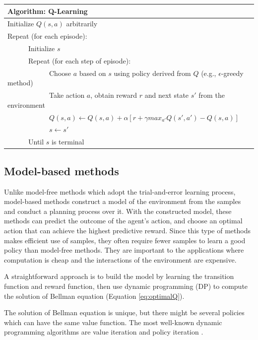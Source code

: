 \begin{center}
\begin{tabular}{@{}lp{6cm}@{}}
\hline
Algorithm: Q-Learning\\
\hline
Initialize $Q(s, a)$ arbitrarily\\
Repeat (for each episode):\\
\ \ \ \ \ \ Initialize $s$\\
\ \ \ \ \ \ Repeat (for each step of episode):\\
\ \ \ \ \ \ \ \ \ \ \ \ Choose $a$ based on $s$ using policy derived from $Q$ (e.g., $\epsilon$-greedy method)\\
\ \ \ \ \ \ \ \ \ \ \ \ Take action $a$, obtain reward $r$ and next state $s'$ from the environment\\
\ \ \ \ \ \ \ \ \ \ \ \ $Q(s, a) \leftarrow Q(s, a) + \alpha [r + \gamma max_{a'} Q(s', a')-Q(s, a)]$\\
\ \ \ \ \ \ \ \ \ \ \ \ $s \leftarrow s'$\\
\ \ \ \ \ \ Until $s$ is terminal\\
\hline  
\end{tabular}
\end{center}

\subsection{Model-based methods}
\label{se:modelbased}
Unlike model-free methods which adopt the trial-and-error learning process,
model-based methods construct a model of the environment from the samples
and conduct a planning process over it. With the constructed model, these methods
can predict the outcome of the agent's action, and choose an optimal action
that can achieve the highest predictive reward.
Since this type of methods makes efficient use of samples, they often
require fewer samples to learn a good policy than model-free methods.
They are important to the applications where computation is cheap and the
interactions of the environment are expensive.

A straightforward approach is to build the model by learning the transition function and
reward function, then use dynamic programming (DP) to compute the solution of
Bellman equation (Equation \ref{eq:optimalQ}).

The solution of Bellman equation is unique, but there might be several
policies which can have the same value function.
The most well-known dynamic programming algorithms are
value iteration \cite{Bellman57} and policy iteration \cite{Howard1960}.

